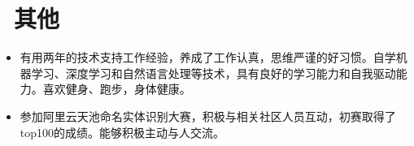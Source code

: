 \documentclass{resume}
\begin{document}



\section{\faInfo\ 其他}\normalsize
\begin{itemize}
\item {有用两年的技术支持工作经验，养成了工作认真，思维严谨的好习惯。自学机器学习、深度学习和自然语言处理等技术，具有良好的学习能力和自我驱动能力。喜欢健身、跑步，身体健康。}
\item{参加阿里云天池命名实体识别大赛，积极与相关社区人员互动，初赛取得了top100的成绩。能够积极主动与人交流。}
\end{itemize}

%
%
\end{document}
